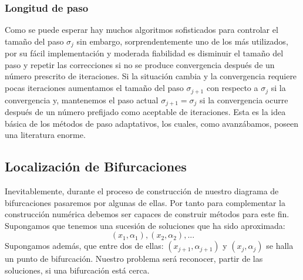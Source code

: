 \subsubsection{Longitud de paso}
\label{longitud}
Como se puede esperar hay muchos algoritmos sofisticados para controlar el tamaño del paso $\sigma_j$ \cite{Keller} sin embargo, sorprendentemente uno de los más utilizados, por su fácil implementación y moderada fiabilidad es disminuir el tamaño del paso y repetir las correcciones si no se produce convergencia después de un número prescrito de iteraciones. Si la situación cambia y la convergencia requiere pocas iteraciones aumentamos el tamaño del paso $\sigma_{j + 1}$ con respecto a $\sigma_j$ si la convergencia y, mantenemos el paso actual $\sigma_{j + 1} = \sigma_j$ si la convergencia ocurre después de un número prefijado como aceptable de iteraciones. Esta es la idea básica de los métodos de paso adaptativos, los cuales, como avanzábamos, poseen una literatura enorme.

\subsection{Localización de Bifurcaciones}
Inevitablemente, durante el proceso de construcción de nuestro diagrama de bifurcaciones pasaremos por algunas de ellas. Por tanto para complementar la construcción numérica debemos ser capaces de construir métodos para este fin. 
Supongamos que tenemos una sucesión de soluciones que ha sido aproximada:
\begin{equation}
(x_1, \alpha_1), (x_2, \alpha_2),...
\end{equation}
Supongamos además, que entre dos de ellas: $ (x_{j+1}, \alpha_{j+1})$ y $(x_j, \alpha_j)$ se halla un punto de bifurcación. Nuestro problema será reconocer,  partir de las soluciones, si una bifurcación está cerca.

